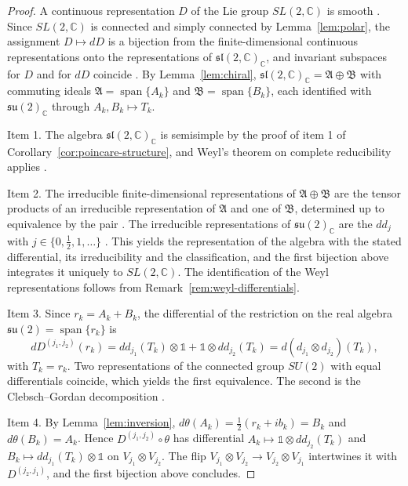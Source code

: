 \begin{proof}
	A continuous representation $D$ of the Lie group $SL(2,\mathbb{C})$ is smooth \cite[TODO-location]{TODO-Lee13}. Since $SL(2,\mathbb{C})$ is connected and simply connected by Lemma~\ref{lem:polar}, the assignment $D\mapsto dD$ is a bijection from the finite-dimensional continuous representations onto the representations of $\mathfrak{sl}(2,\mathbb{C})_{\mathbb{C}}$, and invariant subspaces for $D$ and for $dD$ coincide \cite[TODO-location]{TODO-Hal03}. By Lemma~\ref{lem:chiral}, $\mathfrak{sl}(2,\mathbb{C})_{\mathbb{C}}=\mathfrak{A}\oplus\mathfrak{B}$ with commuting ideals $\mathfrak{A}=\operatorname{span}\{A_k\}$ and $\mathfrak{B}=\operatorname{span}\{B_k\}$, each identified with $\mathfrak{su}(2)_{\mathbb{C}}$ through $A_k,B_k\mapsto T_k$.
	
	Item 1. The algebra $\mathfrak{sl}(2,\mathbb{C})_{\mathbb{C}}$ is semisimple by the proof of item 1 of Corollary~\ref{cor:poincare-structure}, and Weyl's theorem on complete reducibility applies \cite[TODO-location]{TODO-Hum10}.
	
	Item 2. The irreducible finite-dimensional representations of $\mathfrak{A}\oplus\mathfrak{B}$ are the tensor products of an irreducible representation of $\mathfrak{A}$ and one of $\mathfrak{B}$, determined up to equivalence by the pair \cite[TODO-location]{TODO-Hum10}. The irreducible representations of $\mathfrak{su}(2)_{\mathbb{C}}$ are the $dd_j$ with $j\in\{0,\frac12,1,\dots\}$ \cite[TODO-location]{TODO-Hal03}. This yields the representation of the algebra with the stated differential, its irreducibility and the classification, and the first bijection above integrates it uniquely to $SL(2,\mathbb{C})$. The identification of the Weyl representations follows from Remark~\ref{rem:weyl-differentials}.
	
	Item 3. Since $r_k=A_k+B_k$, the differential of the restriction on the real algebra $\mathfrak{su}(2)=\operatorname{span}\{r_k\}$ is
	\begin{equation*}
		dD^{(j_1,j_2)}(r_k)=dd_{j_1}(T_k)\otimes\mathbb{1}+\mathbb{1}\otimes dd_{j_2}(T_k)=d(d_{j_1}\otimes d_{j_2})(T_k),
	\end{equation*}
	with $T_k=r_k$. Two representations of the connected group $SU(2)$ with equal differentials coincide, which yields the first equivalence. The second is the Clebsch--Gordan decomposition \cite[TODO-location]{TODO-Hal03}.
	
	Item 4. By Lemma~\ref{lem:inversion}, $d\theta(A_k)=\tfrac12(r_k+ib_k)=B_k$ and $d\theta(B_k)=A_k$. Hence $D^{(j_1,j_2)}\circ\theta$ has differential $A_k\mapsto\mathbb{1}\otimes dd_{j_2}(T_k)$ and $B_k\mapsto dd_{j_1}(T_k)\otimes\mathbb{1}$ on $V_{j_1}\otimes V_{j_2}$. The flip $V_{j_1}\otimes V_{j_2}\to V_{j_2}\otimes V_{j_1}$ intertwines it with $D^{(j_2,j_1)}$, and the first bijection above concludes.
\end{proof}

